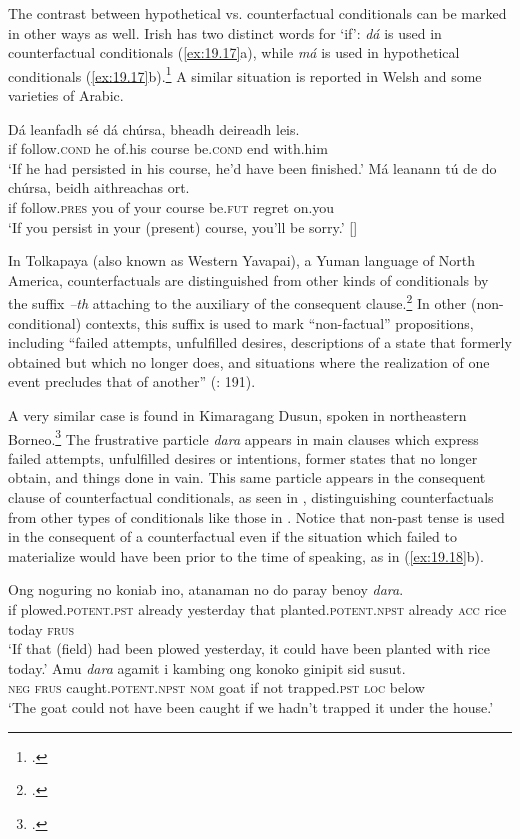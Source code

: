 The contrast between hypothetical vs. counterfactual conditionals can be marked in other ways as well. Irish has two distinct words for ‘if’: \textit{dá} is used in counterfactual conditionals (\ref{ex:19.17}a), while \textit{má} is used in hypothetical conditionals (\ref{ex:19.17}b).\footnote{\citet{McCloskey2001}.} A similar situation is reported in Welsh and some varieties of Arabic.


\ea \label{ex:19.17}
\ea   \gll Dá  leanfadh  sé  dá  chúrsa,  bheadh  deireadh  leis.\\
if  follow.\textsc{cond}  he  of.his  course  be.\textsc{cond}  end  with.him\\
\glt ‘If he had persisted in his course, he’d have been finished.’
\ex \gll  Má  leanann  tú  de  do  chúrsa,  beidh  aithreachas  ort.\\
if  follow.\textsc{pres}  you  of  your  course  be.\textsc{fut}  regret  on.you\\
\glt ‘If you persist in your (present) course, you’ll be sorry.’  [\citealt{McCloskey2001}]
\z \z


In Tolkapaya (also known as Western Yavapai), a Yuman language of North America, counterfactuals are distinguished from other kinds of conditionals by the suffix \textit{–th} attaching to the auxiliary of the consequent clause.\footnote{\citet{HardyGordon1980}.} In other (non-conditional) contexts, this suffix is used to mark “non-factual” propositions, including “failed attempts, unfulfilled desires, descriptions of a state that formerly obtained but which no longer does, and situations where the realization of one event precludes that of another” (\citealt{HardyGordon1980}: 191).



A very similar case is found in Kimaragang Dusun, spoken in northeastern Borneo.\footnote{\citet{Kroeger2017}.} The frustrative particle \textit{dara} appears in main clauses which express failed attempts, unfulfilled desires or intentions, former states that no longer obtain, and things done in vain. This same particle appears in the consequent clause of counterfactual conditionals, as seen in , distinguishing counterfactuals from other types of conditionals like those in . Notice that non-past tense is used in the consequent of a counterfactual even if the situation which failed to materialize would have been prior to the time of speaking, as in (\ref{ex:19.18}b).


\ea \label{ex:19.18}
\ea 
\gll  Ong  noguring  no  koniab  ino,  atanaman  no   do  paray  benoy  \textit{dara}.\\
if  plowed.\textsc{potent.pst}  already  yesterday  that  planted.\textsc{potent.npst}  already \textsc{acc}  rice  today  \textsc{frus}\\
\glt ‘If that (field) had been plowed yesterday, it could have been planted with rice today.’
\ex 
\gll  Amu  \textit{dara}  agamit  i  kambing  ong  konoko  ginipit  sid  susut.\\
\textsc{neg}  \textsc{frus}  caught.\textsc{potent.npst}  \textsc{nom}  goat  if  not  trapped\textsc{.pst}  \textsc{loc}  below\\
\glt ‘The goat could not have been caught if we hadn’t trapped it under the house.’
\z \z

